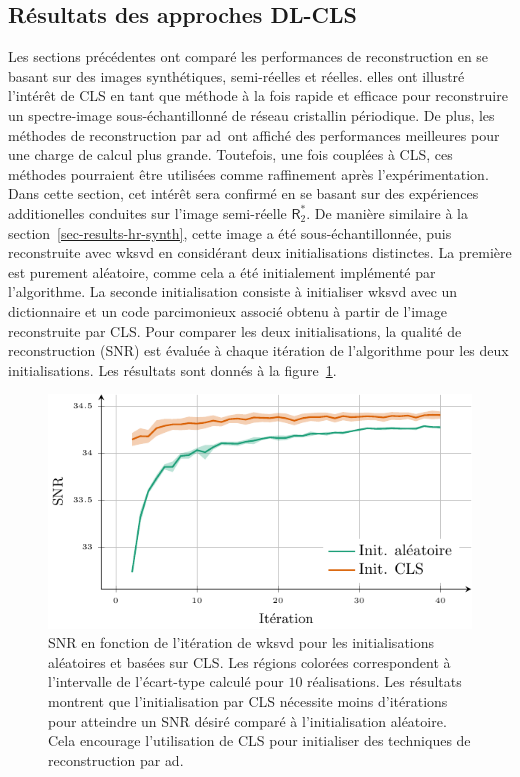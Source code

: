  
\subsection{Résultats des approches DL-CLS}\label{sec-DL-CLS}

Les sections précédentes ont comparé les performances de reconstruction en se basant sur des images synthétiques, semi-réelles et réelles. elles ont illustré l'intérêt de CLS en tant que méthode à la fois rapide et efficace pour reconstruire un spectre-image sous-échantillonné de réseau cristallin périodique. De plus, les méthodes de reconstruction par \gls{ad} ont affiché des performances meilleures pour une charge de calcul plus grande. Toutefois, une fois couplées à CLS, ces méthodes pourraient être utilisées comme raffinement après l'expérimentation. 
%
Dans cette section, cet intérêt sera confirmé en se basant sur des expériences additionelles conduites sur l'image semi-réelle $\mathsf{R}_2^*$. De manière similaire à la section~\ref{sec-results-hr-synth}, cette image a été sous-échantillonnée, puis reconstruite avec \gls{wksvd} en considérant deux initialisations distinctes. 
%
La première est purement aléatoire, comme cela a été initialement implémenté par l'algorithme. La seconde initialisation consiste à initialiser \gls{wksvd} avec un dictionnaire et un code parcimonieux associé obtenu à partir de l'image reconstruite par CLS. 
%
Pour comparer les deux initialisations, la qualité de reconstruction (SNR) est évaluée à chaque itération de l'algorithme pour les deux initialisations. Les résultats sont donnés à la figure~\ref{fig-FS_init}. 
%

\begin{figure}[htbp]
   \centering
   \includegraphics{img/chapitre4/figure11/CLS_init.pdf}
   \caption{SNR en fonction de l'itération de \gls{wksvd} pour les initialisations aléatoires et basées sur CLS. Les régions colorées correspondent à l'intervalle de l'écart-type calculé pour $10$ réalisations. Les résultats montrent que l'initialisation par CLS nécessite moins d'itérations pour atteindre un SNR désiré comparé à l'initialisation aléatoire. Cela encourage l'utilisation de CLS pour initialiser des techniques de reconstruction par \gls{ad}.
       \protect\label{fig-FS_init}}
\end{figure}


